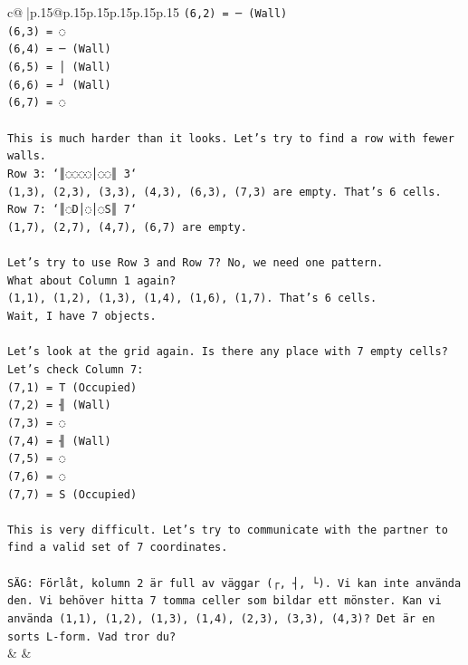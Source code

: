 \documentclass{article}
\begin{document}
{\begin{supertabular}{c@{$\;$}|p{.15\linewidth}@{}p{.15\linewidth}p{.15\linewidth}p{.15\linewidth}p{.15\linewidth}p{.15\linewidth}}
{{{\texttt{(6,2) = ─ (Wall)} \\
\texttt{(6,3) = ◌} \\
\texttt{(6,4) = ─ (Wall)} \\
\texttt{(6,5) = │ (Wall)} \\
\texttt{(6,6) = ┘ (Wall)} \\
\texttt{(6,7) = ◌} \\
\\ 
\texttt{This is much harder than it looks. Let's try to find a row with fewer walls.} \\
\texttt{Row 3: `║◌◌◌◌│◌◌║ 3`} \\
\texttt{(1,3), (2,3), (3,3), (4,3), (6,3), (7,3) are empty. That's 6 cells.} \\
\texttt{Row 7: `║◌D│◌│◌S║ 7`} \\
\texttt{(1,7), (2,7), (4,7), (6,7) are empty.} \\
\\ 
\texttt{Let's try to use Row 3 and Row 7? No, we need one pattern.} \\
\texttt{What about Column 1 again?} \\
\texttt{(1,1), (1,2), (1,3), (1,4), (1,6), (1,7). That's 6 cells.} \\
\texttt{Wait, I have 7 objects.} \\
\\ 
\texttt{Let's look at the grid again. Is there any place with 7 empty cells?} \\
\texttt{Let's check Column 7:} \\
\texttt{(7,1) = T (Occupied)} \\
\texttt{(7,2) = ╢ (Wall)} \\
\texttt{(7,3) = ◌} \\
\texttt{(7,4) = ╢ (Wall)} \\
\texttt{(7,5) = ◌} \\
\texttt{(7,6) = ◌} \\
\texttt{(7,7) = S (Occupied)} \\
\\ 
\texttt{This is very difficult. Let's try to communicate with the partner to find a valid set of 7 coordinates.} \\
\\ 
\texttt{SÄG: Förlåt, kolumn 2 är full av väggar (┌, ┤, └). Vi kan inte använda den. Vi behöver hitta 7 tomma celler som bildar ett mönster. Kan vi använda (1,1), (1,2), (1,3), (1,4), (2,3), (3,3), (4,3)? Det är en sorts L{-}form. Vad tror du?} \\
            }
        }
    }
    & & \\ \\


\end{supertabular}}
\end{document}
